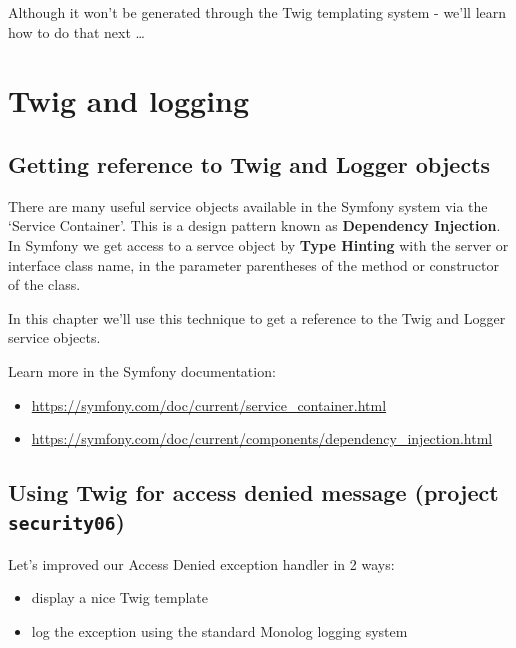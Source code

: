 \documentclass[a4paperpaper,openright]{book}
\begin{document}
Although it won't be generated through the Twig templating system -
we'll learn how to do that next \ldots{}

\hypertarget{twig-and-logging}{%
\chapter{Twig and logging}\label{twig-and-logging}}

\hypertarget{getting-reference-to-twig-and-logger-objects}{%
\section{Getting reference to Twig and Logger
objects}\label{getting-reference-to-twig-and-logger-objects}}

There are many useful service objects available in the Symfony system
via the `Service Container'. This is a design pattern known as
\textbf{Dependency Injection}. In Symfony we get access to a servce
object by \textbf{Type Hinting} with the server or interface class name,
in the parameter parentheses of the method or constructor of the class.

In this chapter we'll use this technique to get a reference to the Twig
and Logger service objects.

Learn more in the Symfony documentation:

\begin{itemize}
\item
  \url{https://symfony.com/doc/current/service_container.html}
\item
  \url{https://symfony.com/doc/current/components/dependency_injection.html}
\end{itemize}

\hypertarget{using-twig-for-access-denied-message-project-security06}{%
\section{\texorpdfstring{Using Twig for access denied message (project
\texttt{security06})}{Using Twig for access denied message (project security06)}}\label{using-twig-for-access-denied-message-project-security06}}

Let's improved our Access Denied exception handler in 2 ways:

\begin{itemize}
\item
  display a nice Twig template
\item
  log the exception using the standard Monolog logging system
\end{itemize}
\end{document}
